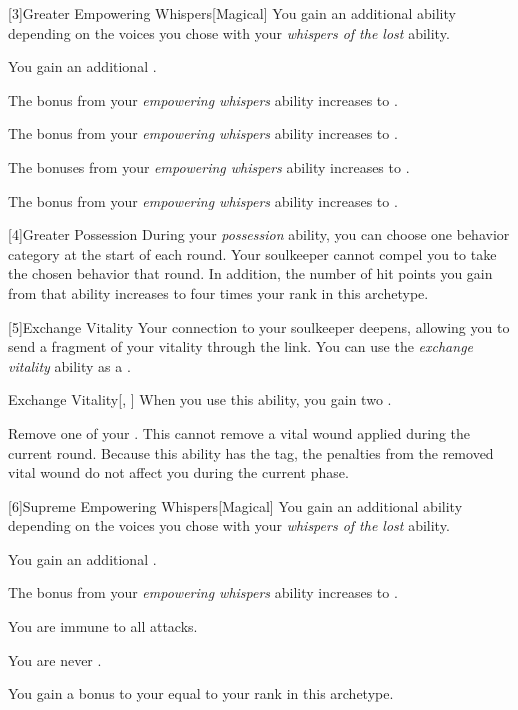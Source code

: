         [3]{Greater Empowering Whispers}[Magical] You gain an additional ability depending on the voices you chose with your \textit{whispers of the lost} ability.
        {
             You gain an additional .

             The bonus from your \textit{empowering whispers} ability increases to .

             The bonus from your \textit{empowering whispers} ability increases to .

             The bonuses from your \textit{empowering whispers} ability increases to .

             The bonus from your \textit{empowering whispers} ability increases to .
        }

        [4]{Greater Possession} During your \textit{possession} ability, you can choose one behavior category at the start of each round.
        Your soulkeeper cannot compel you to take the chosen behavior that round.
        In addition, the number of hit points you gain from that ability increases to four times your rank in this archetype.

        [5]{Exchange Vitality} Your connection to your soulkeeper deepens, allowing you to send a fragment of your vitality through the link.
        You can use the \textit{exchange vitality} ability as a .
        \begin{freeability}{Exchange Vitality}[, ]
            When you use this ability, you gain two .

            Remove one of your .
            This cannot remove a vital wound applied during the current round.
            Because this ability has the  tag, the penalties from the removed vital wound do not affect you during the current phase.
        \end{freeability}

        [6]{Supreme Empowering Whispers}[Magical] You gain an additional ability depending on the voices you chose with your \textit{whispers of the lost} ability.
        {
             You gain an additional .

             The bonus from your \textit{empowering whispers} ability increases to .

             You are immune to all  attacks.

             You are never .

             You gain a bonus to your  equal to your rank in this archetype.
        }

